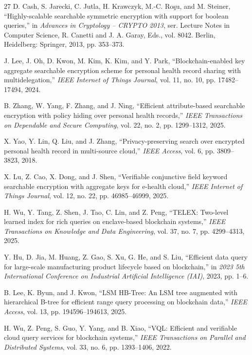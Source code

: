 \begin{thebibliography}{27}
 D. Cash, S. Jarecki, C. Jutla, H. Krawczyk, M.-C. Ro\c{s}u, and M. Steiner, ``Highly-scalable searchable symmetric encryption with support for boolean queries,'' in \emph{Advances in Cryptology -- CRYPTO 2013}, ser. Lecture Notes in Computer Science, R. Canetti and J. A. Garay, Eds., vol. 8042. Berlin, Heidelberg: Springer, 2013, pp. 353--373.

 J. Lee, J. Oh, D. Kwon, M. Kim, K. Kim, and Y. Park, ``Blockchain-enabled key aggregate searchable encryption scheme for personal health record sharing with multidelegation,'' \emph{IEEE Internet of Things Journal}, vol. 11, no. 10, pp. 17482--17494, 2024.

 B. Zhang, W. Yang, F. Zhang, and J. Ning, ``Efficient attribute-based searchable encryption with policy hiding over personal health records,'' \emph{IEEE Transactions on Dependable and Secure Computing}, vol. 22, no. 2, pp. 1299--1312, 2025.

 X. Yao, Y. Lin, Q. Liu, and J. Zhang, ``Privacy-preserving search over encrypted personal health record in multi-source cloud,'' \emph{IEEE Access}, vol. 6, pp. 3809--3823, 2018.

 X. Lu, Z. Cao, X. Dong, and J. Shen, ``Verifiable conjunctive field keyword searchable encryption with aggregate keys for e-health cloud,'' \emph{IEEE Internet of Things Journal}, vol. 12, no. 22, pp. 46985--46999, 2025.

 H. Wu, Y. Tang, Z. Shen, J. Tao, C. Lin, and Z. Peng, ``TELEX: Two-level learned index for rich queries on enclave-based blockchain systems,'' \emph{IEEE Transactions on Knowledge and Data Engineering}, vol. 37, no. 7, pp. 4299--4313, 2025.

 Y. Hu, D. Jia, M. Huang, Z. Gao, S. Xu, G. He, and S. Liu, ``Efficient data query for large-scale manufacturing product lifecycle based on blockchain,'' in \emph{2023 5th International Conference on Industrial Artificial Intelligence (IAI)}, 2023, pp. 1--6.

 B. Lee, K. Byun, and J. Kwon, ``LSM HB-Tree: An LSM tree augmented with hierarchical B-tree for efficient range query processing on blockchain data,'' \emph{IEEE Access}, vol. 13, pp. 194596--194613, 2025.

 H. Wu, Z. Peng, S. Guo, Y. Yang, and B. Xiao, ``VQL: Efficient and verifiable cloud query services for blockchain systems,'' \emph{IEEE Transactions on Parallel and Distributed Systems}, vol. 33, no. 6, pp. 1393--1406, 2022.


\end{thebibliography}
